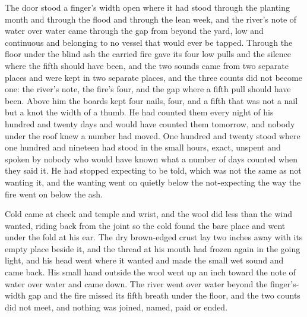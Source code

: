 The door stood a finger's width open where it had stood through the planting month and through the flood and through the lean week, and the river's note of water over water came through the gap from beyond the yard, low and continuous and belonging to no vessel that would ever be tapped. Through the floor under the blind ash the carried fire gave its four low pulls and the silence where the fifth should have been, and the two sounds came from two separate places and were kept in two separate places, and the three counts did not become one: the river's note, the fire's four, and the gap where a fifth pull should have been. Above him the boards kept four nails, four, and a fifth that was not a nail but a knot the width of a thumb. He had counted them every night of his hundred and twenty days and would have counted them tomorrow, and nobody under the roof knew a number had moved. One hundred and twenty stood where one hundred and nineteen had stood in the small hours, exact, unspent and spoken by nobody who would have known what a number of days counted when they said it. He had stopped expecting to be told, which was not the same as not wanting it, and the wanting went on quietly below the not-expecting the way the fire went on below the ash.

Cold came at cheek and temple and wrist, and the wool did less than the wind wanted, riding back from the joint so the cold found the bare place and went under the fold at his ear. The dry brown-edged crust lay two inches away with its empty place beside it, and the thread at his mouth had frozen again in the going light, and his head went where it wanted and made the small wet sound and came back. His small hand outside the wool went up an inch toward the note of water over water and came down. The river went over water beyond the finger's-width gap and the fire missed its fifth breath under the floor, and the two counts did not meet, and nothing was joined, named, paid or ended.

